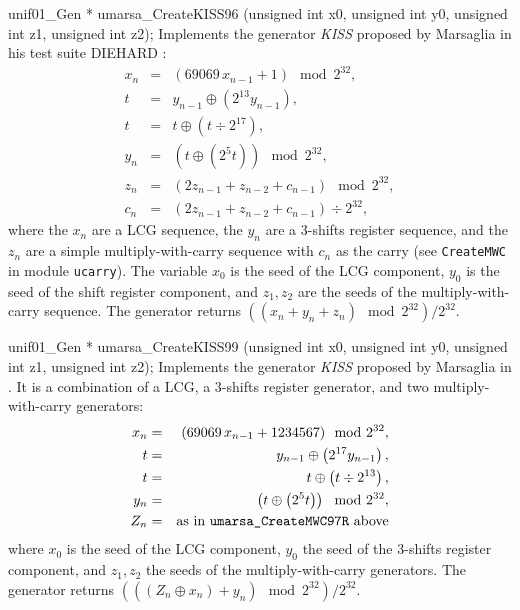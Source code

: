 unif01_Gen * umarsa_CreateKISS96 (unsigned int x0, unsigned int y0,
                                  unsigned int z1, unsigned int z2);
\endcode
 \tab Implements the generator {\it KISS}
 proposed by Marsaglia in his test suite
  DIEHARD \cite{rMAR96a}:
  \begin {eqnarray*}
   x_n &=& \left(69069\,x_{n-1} + 1\right) \mod 2^{32}, \\
   t &=& y_{n-1}\oplus \left(2^{13} y_{n-1}\right), \\
   t &=& t\oplus \left(t \div 2^{17}\right), \\
   y_n &=& \left(t\oplus  \left(2^{5} t\right)\right) \mod 2^{32}, \\
   z_n &=& \left(2z_{n-1}+ z_{n-2} + c_{n-1}\right) \mod 2^{32}, \\
   c_n &=& (2z_{n-1} + z_{n-2} + c_{n-1}) \div 2^{32},
  \end {eqnarray*} 
  where the $x_n$ are a LCG sequence, the $y_n$ are a 3-shifts register
  sequence, and the $z_n$ are a simple multiply-with-carry sequence
  with $c_n$ as the carry (see {\tt CreateMWC} in module  {\tt ucarry}).
  The variable $x_0$ is the seed of the LCG component,  $y_0$ is the seed
  of the shift register component, and $z_1, z_2$ are the seeds of
  the  multiply-with-carry sequence. The generator returns
  $\left((x_n + y_n + z_n) \mod 2^{32}\right) / 2^{32}$.
  \endtab
\code


unif01_Gen * umarsa_CreateKISS99 (unsigned int x0, unsigned int y0,
                                  unsigned int z1, unsigned int z2);
\endcode
 \tab Implements the generator {\it KISS} proposed by Marsaglia in
 \cite{rMAR99a}. It is a combination of a LCG, a 3-shifts register generator,
%
  and two multiply-with-carry generators:
  \begin {eqnarray*}
   x_n &=& (69069\,x_{n-1} + 1234567) \mod 2^{32}, \\
   t &=& y_{n-1}\oplus \left(2^{17} y_{n-1} \right), \\
   t &=& t\oplus \left(t \div 2^{13}\right), \\
   y_n &=& \left( t\oplus  \left(2^{5} t \right)\right) \mod 2^{32}, \\
   Z_n &=& \mbox{as in {\tt umarsa\_CreateMWC97R} above}
  \end {eqnarray*} 
   where $x_0$ is the seed of the LCG component, $y_0$ the seed of the
  3-shifts register component, and $z_1, z_2$ the seeds of the
  multiply-with-carry generators. The generator returns
   $\left( ((Z_n \oplus x_n) + y_n) \mod 2^{32}\right)/2^{32}$.
  \endtab
\code


